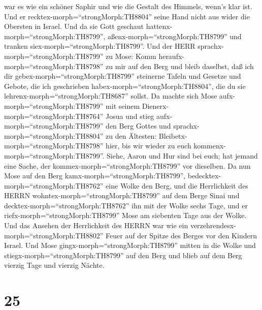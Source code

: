 war es wie ein schöner Saphir und wie die Gestalt des Himmels, wenn's
klar ist.  Und er recktex-morph=``strongMorph:TH8804''
seine Hand nicht aus wider die Obersten in Israel. Und da sie Gott
geschaut hattenx-morph=``strongMorph:TH8799'',
aßenx-morph=``strongMorph:TH8799'' und tranken
siex-morph=``strongMorph:TH8799''.  Und der HERR
sprachx-morph=``strongMorph:TH8799'' zu Mose: Komm
heraufx-morph=``strongMorph:TH8798'' zu mir auf den Berg und bleib
daselbst, daß ich dir gebex-morph=``strongMorph:TH8799'' steinerne
Tafeln und Gesetze und Gebote, die ich geschrieben
habex-morph=``strongMorph:TH8804'', die du sie
lehrenx-morph=``strongMorph:TH8687'' sollst.  Da machte
sich Mose aufx-morph=``strongMorph:TH8799'' mit seinem
Dienerx-morph=``strongMorph:TH8764'' Josua und stieg
aufx-morph=``strongMorph:TH8799'' den Berg Gottes  und
sprachx-morph=``strongMorph:TH8804'' zu den Ältesten:
Bleibetx-morph=``strongMorph:TH8798'' hier, bis wir wieder zu euch
kommenx-morph=``strongMorph:TH8799''. Siehe, Aaron und Hur sind bei
euch; hat jemand eine Sache, der kommex-morph=``strongMorph:TH8799'' vor
dieselben.  Da nun Mose auf den Berg
kamx-morph=``strongMorph:TH8799'',
bedecktex-morph=``strongMorph:TH8762'' eine Wolke den Berg,
 und die Herrlichkeit des HERRN
wohntex-morph=``strongMorph:TH8799'' auf dem Berge Sinai und
decktex-morph=``strongMorph:TH8762'' ihn mit der Wolke sechs Tage, und
er riefx-morph=``strongMorph:TH8799'' Mose am siebenten Tage aus der
Wolke.  Und das Ansehen der Herrlichkeit des HERRN war wie
ein verzehrendesx-morph=``strongMorph:TH8802'' Feuer auf der Spitze des
Berges vor den Kindern Israel.  Und Mose
gingx-morph=``strongMorph:TH8799'' mitten in die Wolke und
stiegx-morph=``strongMorph:TH8799'' auf den Berg und blieb auf dem Berg
vierzig Tage und vierzig Nächte.

\hypertarget{section-24}{%
\section{25}\label{section-24}}

